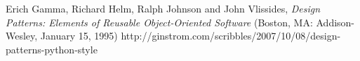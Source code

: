 \documentclass[12pt, oneside]{book} %
\newcommand{\HRule}{\rule{\linewidth}{0.5mm}} %
\newcommand{\tmpsection}[1]{}
\let\tmpsection=\section
\renewcommand{\section}[1]{
  { 
    \samepage{
      \vspace{10 mm} \linespread{0.75} \color{RoyalBlue}{
        \noindent \HRule \tmpsection{#1} \noindent \HRule
      }
    }
  }
}
\begin{document}

\begin{thebibliography}{99}
 Erich Gamma, Richard Helm, Ralph Johnson and John Vlissides, \emph{Design Patterns: Elements of Reusable Object-Oriented Software} (Boston, MA: Addison-Wesley, January 15, 1995)
 http://ginstrom.com/scribbles/2007/10/08/design-patterns-python-style
\end{thebibliography}
\end{document}
